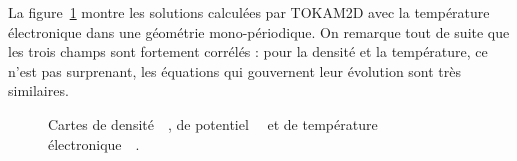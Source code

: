 \begin{refsection}
La figure~\ref{2-CartesWithTe} montre les solutions calculées par TOKAM2D avec
la température électronique dans une géométrie mono-périodique. On remarque tout
de suite que les trois champs sont fortement corrélés : pour la densité et
la température, ce n'est pas surprenant, les équations qui gouvernent leur
évolution sont très similaires. 
\begin{figure}[!htbp]
    \centering
    \caption{Cartes de densité~~, de
    potentiel~~ et de température 
    électronique~~.}
    \label{2-CartesWithTe}
	\end{figure}
	

\end{refsection}
